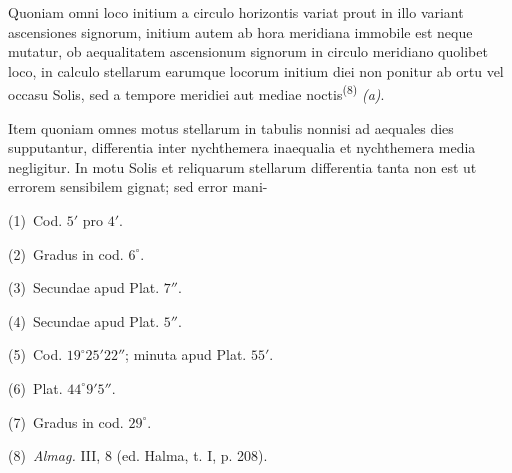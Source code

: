 \documentclass[10pt]{article}
\newcommand{\A}[1]{\hypertarget{#1}{}}
\newcommand{\NM}[1]{\textsuperscript{(#1)}}
\newcommand{\NN}[2]{\par\noindent\textup{(#1)}\ #2}
\begin{document}
\A{AB01-PDF0137-P05}
Quoniam omni loco initium a circulo horizontis variat prout
in illo variant ascensiones signorum, initium autem ab hora
meridiana immobile est neque mutatur, ob aequalitatem
ascensionum signorum in circulo meridiano quolibet loco,
in calculo stellarum earumque locorum initium diei non
ponitur ab ortu vel occasu Solis, sed a tempore meridiei
aut mediae noctis\NM{8} \textit{(a)}.

\A{AB01-PDF0137-P06}
Item quoniam omnes motus stellarum in tabulis nonnisi ad
aequales dies supputantur, differentia inter nychthemera
inaequalia et nychthemera media negligitur. In motu Solis
et reliquarum stellarum differentia tanta non est ut
errorem sensibilem gignat; sed error mani-


\begin{multicols}{2}
\footnotesize

\A{AB01-PDF0137-N01}
\NN{1}{Cod. $5'$ pro $4'$.}

\A{AB01-PDF0137-N02}
\NN{2}{Gradus in cod. $6^\circ$.}

\A{AB01-PDF0137-N03}
\NN{3}{Secundae apud Plat. $7''$.}

\A{AB01-PDF0137-N04}
\NN{4}{Secundae apud Plat. $5''$.}

\A{AB01-PDF0137-N05}
\NN{5}{Cod. $19^\circ25'22''$; minuta apud Plat. $55'$.}

\A{AB01-PDF0137-N06}
\NN{6}{Plat. $44^\circ9'5''$.}

\A{AB01-PDF0137-N07}
\NN{7}{Gradus in cod. $29^\circ$.}

\A{AB01-PDF0137-N08}
\NN{8}{\textit{Almag.} III, 8 (ed. Halma, t. I, p. 208).}

\end{multicols}
\end{document}
